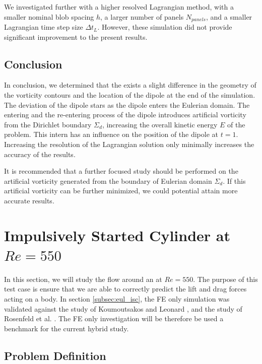 We investigated further with a higher resolved Lagrangian method, with a smaller nominal blob spacing $h$, a larger number of panels $N_{panels}$, and a smaller Lagrangian time step size $\Delta t_L$. However, these simulation did not provide significant improvement to the present results. 


\subsection{Conclusion}

In conclusion, we determined that the exists a slight difference in the geometry of the vorticity contours and the location of the dipole at the end of the simulation. The deviation of the dipole stars as the dipole enters the Eulerian domain. The entering and the re-entering process of the dipole introduces artificial vorticity from the Dirichlet boundary $\Sigma_d$, increasing the overall kinetic energy $E$ of the problem. This intern has an influence on the position of the dipole at $t=1$. Increasing the resolution of the Lagrangian solution only minimally increases the accuracy of the results. 

It is recommended that a further focused study should be performed on the artificial vorticity generated from the boundary of Eulerian domain $\Sigma_d$. If this artificial vorticity can be further minimized, we could potential attain more accurate results.

\section{Impulsively Started Cylinder at $Re=550$}
\label{sec:vvhm-isc}
In this section, we will study the flow around an  at $Re=550$. The purpose of this test case is ensure that we are able to correctly predict the lift and drag forces acting on a body. In section \ref{subsec:eul_isc}, the FE only simulation was validated against the study of Koumoutsakos and Leonard \cite{Koumoutsakos1995a}, and the study of Rosenfeld et al. \cite{MosheRosenFeldDochanKwak1991}. The FE only investigation will be therefore be used a benchmark for the current hybrid study.

\subsection{Problem Definition}

